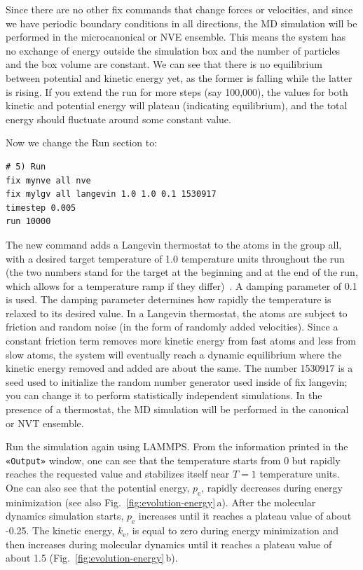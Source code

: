 \documentclass[9pt,tutorial]{livecoms}
\newcommand{\lmpcmd}[1]{\hspace{0pt}\colorbox{listing}{\textcolor{command}{\small{#1}}}\hspace{0pt}} %
\newcommand{\guicmd}[1]{\textcolor{command}{\texttt{«#1»}}} %
\begin{document}
Since there are no other fix commands that change forces or velocities,
and since we have periodic boundary conditions in all directions, the MD
simulation will be performed in the microcanonical or NVE ensemble.
This means the system has no exchange of energy outside the simulation
box and the number of particles and the box volume are constant.  We can
see that there is no equilibrium between potential and kinetic energy
yet, as the former is falling while the latter is rising.  If you extend
the run for more steps (say 100,000), the values for both kinetic and
potential energy will plateau (indicating equilibrium), and the total
energy should fluctuate around some constant value.

Now we change the \lmpcmd{Run} section to:
\begin{lstlisting}
# 5) Run
fix mynve all nve
fix mylgv all langevin 1.0 1.0 0.1 1530917
timestep 0.005
run 10000
\end{lstlisting}
The new command adds a Langevin thermostat to the atoms in the group
\lmpcmd{all}, with a desired target temperature of 1.0 temperature units
throughout the run (the two numbers stand for the target at the beginning
and at the end of the run, which allows for a temperature ramp if
they differ)~\cite{schneider1978molecular}.  A \lmpcmd{damping}
parameter of 0.1 is used.  The \lmpcmd{damping} parameter determines how
rapidly the temperature is relaxed to its desired value.  In a Langevin
thermostat, the atoms are subject to friction and random noise (in the form
of randomly added velocities).  Since a constant friction term removes
more kinetic energy from fast atoms and less from slow atoms, the system
will eventually reach a dynamic equilibrium where the kinetic energy
removed and added are about the same.  The number 1530917 is a
seed used to initialize the random number generator used inside of
\lmpcmd{fix langevin}; you can change it to perform statistically
independent simulations.  In the presence of a thermostat, the MD simulation
will be performed in the canonical or NVT ensemble.

Run the simulation again using LAMMPS. From the information
printed in the \guicmd{Output} window, one can see that the temperature
starts from 0 but rapidly reaches the requested value and
stabilizes itself near $T=1$ temperature units.  One can also see that
the potential energy, $p_\text{e}$, rapidly decreases during energy
minimization (see also Fig.~\ref{fig:evolution-energy}\,a).  After
the molecular dynamics simulation starts, $p_\text{e}$ increases until
it reaches a plateau value of about -0.25.  The kinetic energy,
$k_\text{e}$, is equal to zero during energy minimization and then
increases during molecular dynamics until it reaches a plateau value of
about 1.5 (Fig.~\ref{fig:evolution-energy}\,b).
\end{document}
